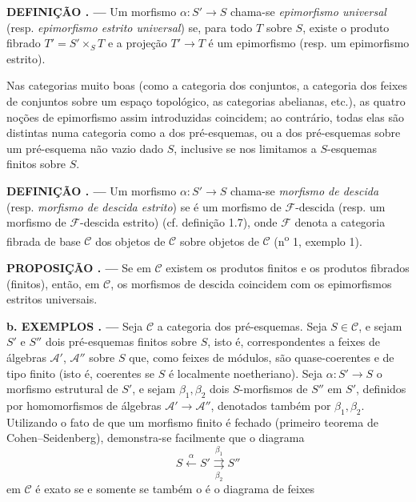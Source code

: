 \documentclass[11pt,twoside,openany]{book}
\numberwithin{equation}{section}
\theoremstyle{plain}
\theoremstyle{definition}
\theoremstyle{remark}
\newcommand{\result}[2]{%
  \par\medskip\noindent\textbf{#1%
  \if\relax\detokenize{#2}\relax\else\space#2\fi. ---}\enspace
}
\begin{document}
\result{DEFINIÇÃO}{2.3} Um morfismo $\alpha:S'\longrightarrow S$ chama-se
\emph{epimorfismo universal} (resp. \emph{epimorfismo estrito universal}) se,
para todo $T$ sobre $S$, existe o produto fibrado $T'=S'\times_ST$ e a
projeção $T'\longrightarrow T$ é um epimorfismo (resp. um epimorfismo
estrito).

Nas categorias muito boas (como a categoria dos conjuntos, a
categoria dos feixes de conjuntos sobre um espaço topológico, as categorias
abelianas, etc.), as quatro noções de epimorfismo assim introduzidas
coincidem; ao contrário, todas elas são distintas numa categoria como
a dos pré-esquemas, ou a dos pré-esquemas sobre um pré-esquema não vazio
dado $S$, inclusive se nos limitamos a $S$-esquemas finitos sobre $S$.

\result{DEFINIÇÃO}{2.4} Um morfismo $\alpha:S'\longrightarrow S$ chama-se
\emph{morfismo de descida} (resp. \emph{morfismo de descida estrito}) se é
um morfismo de $\mathcal F$-descida (resp. um morfismo de
$\mathcal F$-descida estrito) (cf. definição 1.7), onde $\mathcal F$ denota
a categoria fibrada de base $\mathcal C$ dos objetos de $\mathcal C$ sobre
objetos de $\mathcal C$ (n\textsuperscript{o} 1, exemplo 1).

\result{PROPOSIÇÃO}{2.1} Se em $\mathcal C$ existem os produtos finitos e
os produtos fibrados (finitos), então, em $\mathcal C$, os morfismos de
descida coincidem com os epimorfismos estritos universais.

\result{b. EXEMPLOS}{} Seja $\mathcal C$ a categoria dos pré-esquemas. Seja
$S\in\mathcal C$, e sejam $S'$ e $S''$ dois pré-esquemas finitos sobre $S$,
isto é, correspondentes a feixes de álgebras $\mathcal A'$, $\mathcal A''$
sobre $S$ que, como feixes de módulos, são quase-coerentes e de tipo finito
(isto é, coerentes se $S$ é localmente noetheriano). Seja
$\alpha:S'\longrightarrow S$ o morfismo estrutural de $S'$, e sejam
$\beta_1,\beta_2$ dois $S$-morfismos de $S''$ em $S'$, definidos por
homomorfismos de álgebras $\mathcal A'\longrightarrow\mathcal A''$, denotados
também por $\beta_1,\beta_2$. Utilizando o fato de que um morfismo finito é
fechado (primeiro teorema de Cohen--Seidenberg), demonstra-se facilmente que o
diagrama
\[
  \tag{+}
  S\xleftarrow{\alpha}S'
  \overset{\beta_1}{\underset{\beta_2}{\rightrightarrows}}S''
\]
em $\mathcal C$ é exato se e somente se também o é o diagrama de feixes
\end{document}
